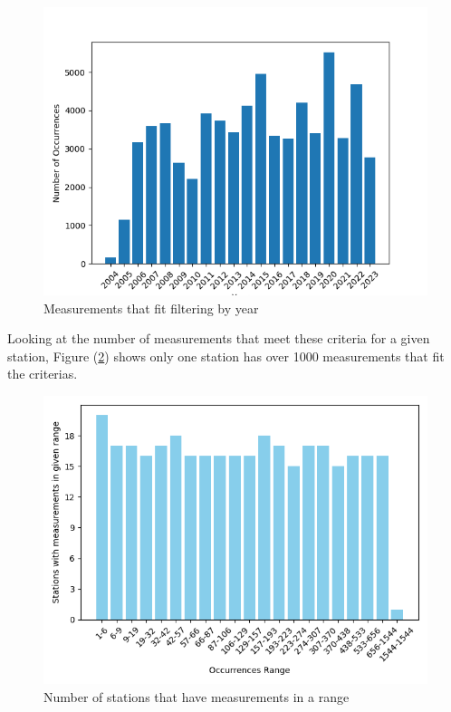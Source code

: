 \begin{figure}
    \caption{Measurements that fit filtering by year}
    \label{fig:occurrences_by_year}
    \begin{center}
        \includegraphics[scale = 0.75]{Figures/occurrences_by_year.png}
    \end{center}
\end{figure}

Looking at the number of measurements that meet these criteria for a given station, Figure (\ref{fig:occurrences_by_station_20}) shows only one station has over 1000 measurements that fit the criterias.

\begin{figure}
    \caption{Number of stations that have measurements in a range}
    \label{fig:occurrences_by_station_20}
    \begin{center}
        \includegraphics[scale = 0.75]{Figures/station_occurrences_20.png}        
    \end{center}
\end{figure}

